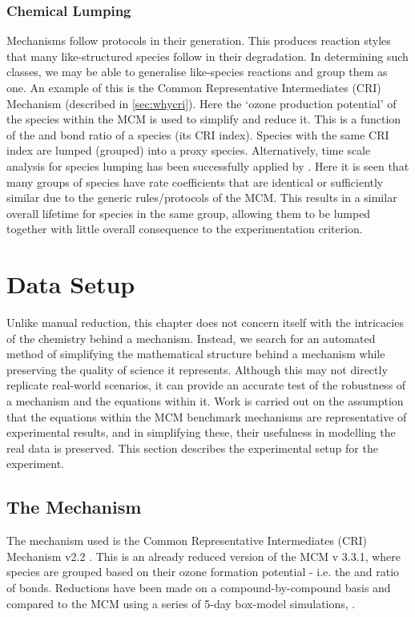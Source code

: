 \subsubsection{Chemical Lumping}\label{sec:chemlump}
Mechanisms follow protocols in their generation. This produces reaction styles that many like-structured species follow in their degradation. In determining such classes, we may be able to generalise like-species reactions and group them as one.
An example of this is the Common Representative Intermediates (CRI) Mechanism (described in \autoref{sec:whycri}).  Here the `ozone production potential' of the species within the MCM is used to simplify and reduce it. This is a function of the  and  bond ratio of a species (its CRI index). Species with the same CRI index are lumped (grouped) into a proxy species. Alternatively, time scale analysis for species lumping has been successfully applied by  \citep{lifetime}. Here it is seen that many groups of species have rate coefficients that are identical or sufficiently similar due to the generic rules/protocols of the MCM. This results in a similar overall lifetime for species in the same group, allowing them to be lumped together with little overall consequence to the experimentation criterion.


\section{Data Setup}
Unlike manual reduction, this chapter does not concern itself with the intricacies of the chemistry behind a mechanism. Instead, we search for an automated method of simplifying the mathematical structure behind a mechanism while preserving the quality of science it represents. Although this may not directly replicate real-world scenarios, it can provide an accurate test of the robustness of a mechanism and the equations within it.
Work is carried out on the assumption that the equations within the MCM benchmark mechanisms are representative of experimental results, and in simplifying these, their usefulness in modelling the real data is preserved. This section describes the experimental setup for the experiment.


\subsection{The Mechanism}


The mechanism used is the Common Representative Intermediates (CRI) Mechanism v2.2 \citep{criv2}. This is an already reduced version of the MCM v 3.3.1, where species are grouped based on their ozone formation potential - i.e. the  and  ratio of bonds.
Reductions have been made on a compound-by-compound basis and compared to the MCM using a series of 5-day box-model simulations, \citep{cri}.

